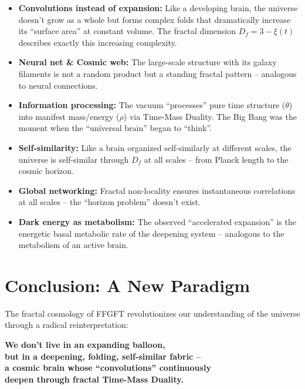 \documentclass[12pt,a4paper]{article}
\begin{document}
\begin{itemize}[leftmargin=*]
\item \textbf{Convolutions instead of expansion:} Like a developing brain, the universe doesn't grow as a whole but forms complex folds that dramatically increase its ``surface area'' at constant volume. The fractal dimension $D_f = 3 - \xi(t)$ describes exactly this increasing complexity.

\item \textbf{Neural net \& Cosmic web:} The large-scale structure with its galaxy filaments is not a random product but a standing fractal pattern -- analogous to neural connections.

\item \textbf{Information processing:} The vacuum ``processes'' pure time structure ($\theta$) into manifest mass/energy ($\rho$) via Time-Mass Duality. The Big Bang was the moment when the ``universal brain'' began to ``think''.

\item \textbf{Self-similarity:} Like a brain organized self-similarly at different scales, the universe is self-similar through $D_f$ at all scales -- from Planck length to the cosmic horizon.

\item \textbf{Global networking:} Fractal non-locality ensures instantaneous correlations at all scales -- the ``horizon problem'' doesn't exist.

\item \textbf{Dark energy as metabolism:} The observed ``accelerated expansion'' is the energetic basal metabolic rate of the deepening system -- analogous to the metabolism of an active brain.
\end{itemize}

\section{Conclusion: A New Paradigm}

The fractal cosmology of FFGFT revolutionizes our understanding of the universe through a radical reinterpretation:

\begin{center}
\textbf{We don't live in an expanding balloon,} \\
\textbf{but in a deepening, folding, self-similar fabric --} \\
\textbf{a cosmic brain whose ``convolutions'' continuously} \\
\textbf{deepen through fractal Time-Mass Duality.}
\end{center}
\end{document}
